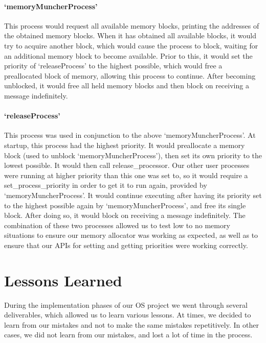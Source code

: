 \documentclass[12pt]{report}
\begin{document}
\subsection{`memoryMuncherProcess'}

    This process would request all available memory blocks, printing the
    addresses of the obtained memory blocks.  When it has obtained all available
    blocks, it would try to acquire another block, which would cause the process
    to block, waiting for an additional memory block to become available.  Prior
    to this, it would set the priority of `releaseProcess' to the highest
    possible, which would free a preallocated block of memory, allowing this
    process to continue.  After becoming unblocked, it would free all held
    memory blocks and then block on receiving a message indefinitely.

\subsection{`releaseProcess'}

    This process was used in conjunction to the above `memoryMuncherProcess'.
    At startup, this process had the highest priority.  It would preallocate a
    memory block (used to unblock `memoryMuncherProcess'), then set its own
    priority to the lowest possible.  It would then call release\_processor.
    Our other user processes were running at higher priority than this one was
    set to, so it would require a set\_process\_priority in order to get it to
    run again, provided by `memoryMuncherProcess'.  It would continue executing
    after having its priority set to the highest possible again by
    `memoryMuncherProcess', and free its single block.  After doing so, it would
    block on receiving a message indefinitely.  The combination of these two
    processes allowed us to test low to no memory situations to ensure our
    memory allocator was working as expected, as well as to ensure that our
    APIs for setting and getting priorities were working correctly.

\part{Lessons Learned}

    During the implementation phases of our OS project we went through several
    deliverables, which allowed us to learn various lessons. At times, we
    decided to learn from our mistakes and not to make the same mistakes
    repetitively. In other cases, we did not learn from our mistakes, and lost a
    lot of time in the process.
\end{document}
